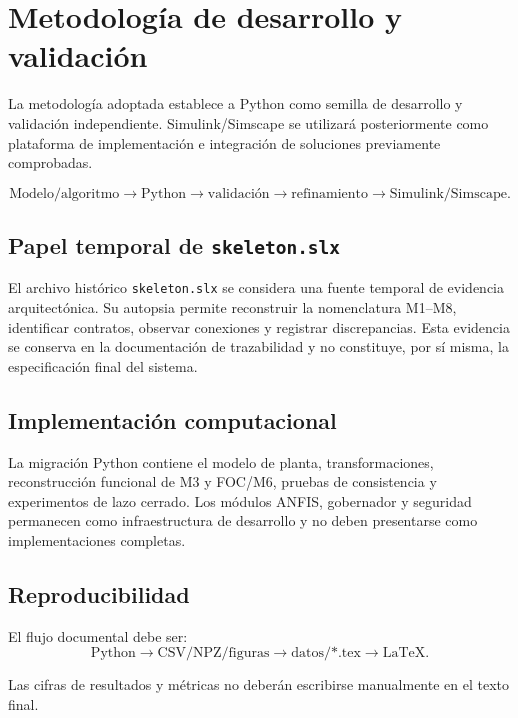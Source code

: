 \section{Metodología de desarrollo y validación}

La metodología adoptada establece a Python como semilla de desarrollo y validación independiente. Simulink/Simscape se utilizará posteriormente como plataforma de implementación e integración de soluciones previamente comprobadas.

\begin{equation}
\text{Modelo/algoritmo}\rightarrow\text{Python}\rightarrow\text{validación}\rightarrow\text{refinamiento}\rightarrow\text{Simulink/Simscape}.
\end{equation}

\subsection{Papel temporal de \texttt{skeleton.slx}}

El archivo histórico \texttt{skeleton.slx} se considera una fuente temporal de evidencia arquitectónica. Su autopsia permite reconstruir la nomenclatura M1--M8, identificar contratos, observar conexiones y registrar discrepancias. Esta evidencia se conserva en la documentación de trazabilidad y no constituye, por sí misma, la especificación final del sistema.

\subsection{Implementación computacional}

La migración Python contiene el modelo de planta, transformaciones, reconstrucción funcional de M3 y FOC/M6, pruebas de consistencia y experimentos de lazo cerrado. Los módulos ANFIS, gobernador y seguridad permanecen como infraestructura de desarrollo y no deben presentarse como implementaciones completas.

\subsection{Reproducibilidad}

El flujo documental debe ser:
\begin{equation}
\text{Python}\rightarrow\text{CSV/NPZ/figuras}\rightarrow\text{datos/*.tex}\rightarrow\text{LaTeX}.
\end{equation}

Las cifras de resultados y métricas no deberán escribirse manualmente en el texto final.
